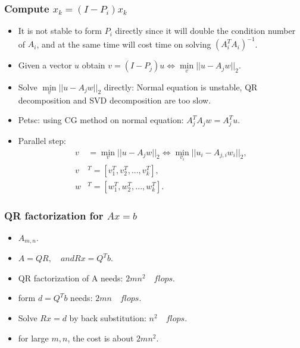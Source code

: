 \documentclass{beamer}
\begin{document}
\begin{frame}
 \frametitle{Compute $x_{k}=(I-P_{i})x_{k}$}
 \begin{itemize}
  \item It is not stable to form $P_{i}$ directly since it will double the condition number of $A_{i}$, and at the same time will cost time on solving
        $(A^{T}_{i}A_{i})^{-1}$.
  \item Given a vector $u$ obtain $v=(I-P_{j})u \Leftrightarrow \min\limits_{v}||u-A_{j}w||_{2}$.
  \item Solve $\min\limits_{v}||u-A_{j}w||_{2}$ directly: Normal equation is unstable, QR decomposition and SVD decomposition are too slow.
  \item Petsc: using CG method on normal equation: $A_{j}^{T}A_{j}w=A_{j}^{T}u$.
  \item Parallel step:
        \begin{equation*}
            \begin{split}
                v&=\min\limits_{v}||u-A_{j}w||_{2}\Leftrightarrow \min\limits_{v_{i}}||u_{i}-A_{j,i}w_{i}||_{2},\\
                v&^{T}=[v_{1}^{T},v_{2}^{T},...,v_{k}^{T}],\\
                w&^{T}=[w_{1}^{T},w_{2}^{T},...,w_{k}^{T}].
            \end{split}
        \end{equation*}
 \end{itemize}


\end{frame}


\begin{frame}
\frametitle{QR factorization for $Ax=b$}
\begin{itemize}
  \item $A_{m,n}$.
  \item $A=QR,\quad and Rx=Q^{T}b$.
  \item QR factorization of A needs: $2mn^2 \quad flops$.
  \item form $d=Q^{T}b$ needs: $2mn \quad flops$.
  \item Solve $Rx=d$ by back substitution: $n^2 \quad flops$.
  \item for large $m, n$, the cost is about $2mn^2$.
\end{itemize}
\end{frame}
\end{document}
